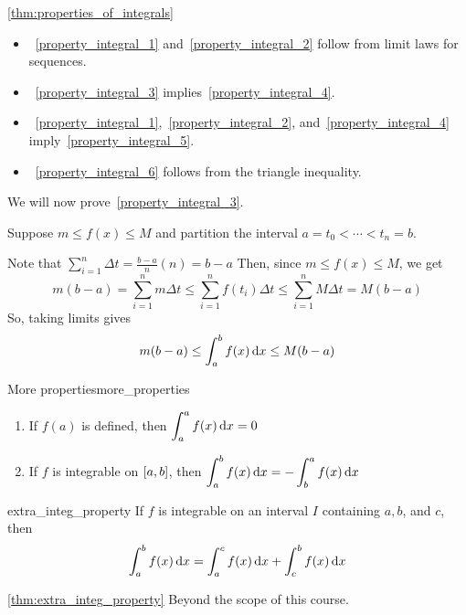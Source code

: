 \begin{Proof}{\ref{thm:properties_of_integrals}}{}
    \begin{itemize}
        \item~\ref{property_integral_1} and~\ref{property_integral_2} follow from limit laws
              for sequences.
        \item~\ref{property_integral_3} implies~\ref{property_integral_4}.
        \item~\ref{property_integral_1},~\ref{property_integral_2},
              and~\ref{property_integral_4} imply~\ref{property_integral_5}.
        \item~\ref{property_integral_6} follows from the triangle inequality.
    \end{itemize}

    We will now prove~\ref{property_integral_3}.

    Suppose $ m\le f(x)\le M $ and partition the interval
    $ a=t_0<\cdots<t_n=b $.

    Note that
    $ \displaystyle\sum\limits_{i=1}^{n} \Delta t=\frac{b-a}{n}(n)=b-a $
    Then, since $ m\le f(x)\le M $, we get
    \[ m(b-a)=\sum\limits_{i=1}^{n} m\Delta t\le \sum\limits_{i=1}^{n} f(t_i)\Delta t
        \le \sum\limits_{i=1}^{n} M\Delta t=M(b-a) \]
    So, taking limits gives
    \[ m(b-a)\le \int_{a}^{b} f(x)\odif{x} \le M(b-a) \]
\end{Proof}

\begin{Definition}{More properties}{more_properties}
    \begin{enumerate}[label=(\Roman*)]
        \item If $ f(a) $ is defined, then
              $ \displaystyle\int_{a}^{a} f(x)\odif{x} =0 $
        \item If $ f $ is integrable on $ \interval{a}{b} $, then
              $ \displaystyle\int_{a}^{b} f(x)\odif{x}=-\int_{b}^{a} f(x)\odif{x} $
    \end{enumerate}
\end{Definition}

\begin{Theorem}{}{extra_integ_property}
    If $ f $ is integrable on an interval $ I $ containing $ a,b $, and $ c $, then
    \[ \int_{a}^{b} f(x)\odif{x}=\int_{a}^{c} f(x)\odif{x}+\int_{c}^{b} f(x)\odif{x} \]
\end{Theorem}

\begin{Proof}{\ref{thm:extra_integ_property}}{}
    Beyond the scope of this course.
\end{Proof}

